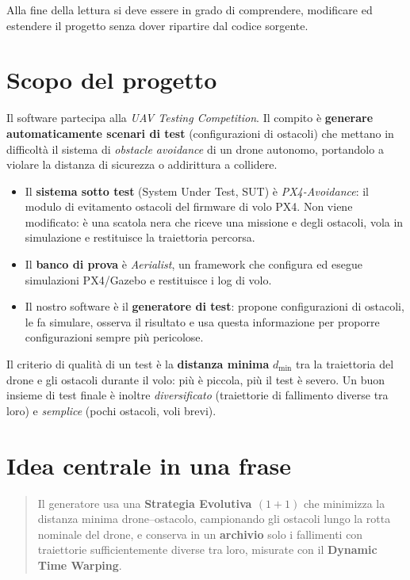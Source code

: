 \documentclass[11pt,a4paper]{report}
\begin{document}
Alla fine della lettura si deve essere in grado di comprendere,
modificare ed estendere il progetto senza dover ripartire dal codice
sorgente.

\section{Scopo del progetto}
Il software partecipa alla \emph{UAV Testing Competition}. Il compito è
\textbf{generare automaticamente scenari di test} (configurazioni di
ostacoli) che mettano in difficoltà il sistema di
\emph{obstacle avoidance} di un drone autonomo, portandolo a violare la
distanza di sicurezza o addirittura a collidere.

\begin{itemize}
  \item Il \textbf{sistema sotto test} (System Under Test, SUT) è
        \emph{PX4-Avoidance}: il modulo di evitamento ostacoli del
        firmware di volo PX4. Non viene modificato: è una scatola nera
        che riceve una missione e degli ostacoli, vola in simulazione e
        restituisce la traiettoria percorsa.
  \item Il \textbf{banco di prova} è \emph{Aerialist}, un framework che
        configura ed esegue simulazioni PX4/Gazebo e restituisce i log
        di volo.
  \item Il nostro software è il \textbf{generatore di test}: propone
        configurazioni di ostacoli, le fa simulare, osserva il risultato
        e usa questa informazione per proporre configurazioni sempre più
        pericolose.
\end{itemize}

Il criterio di qualità di un test è la \textbf{distanza minima}
$d_{\min}$ tra la traiettoria del drone e gli ostacoli durante il volo:
più è piccola, più il test è severo. Un buon insieme di test finale è
inoltre \emph{diversificato} (traiettorie di fallimento diverse tra
loro) e \emph{semplice} (pochi ostacoli, voli brevi).

\section{Idea centrale in una frase}
\begin{quote}
Il generatore usa una \textbf{Strategia Evolutiva $(1+1)$} che
minimizza la distanza minima drone--ostacolo, campionando gli ostacoli
lungo la rotta nominale del drone, e conserva in un \textbf{archivio}
solo i fallimenti con traiettorie sufficientemente diverse tra loro,
misurate con il \textbf{Dynamic Time Warping}.
\end{quote}
\end{document}
